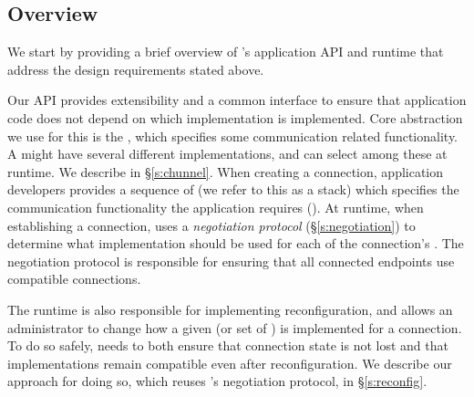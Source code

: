 \begin{outline}
      \2 
\end{outline}

\subsection{\name Overview}
\begin{outline}
\0 We start by providing a brief overview of \name's application API and runtime that address the design requirements stated above.

\0 Our API provides extensibility and a common interface to ensure that application code does not depend on which implementation is implemented.
    \1 Core abstraction we use for this is the \tunnel, which specifies some communication related functionality. A \tunnel might have several different implementations, and \name can select among these at runtime. We describe \tunnels in \S\ref{s:chunnel}.
    \1 When creating a connection, application developers provides a sequence of \tunnels (we refer to this as a \tunnel stack) which specifies the communication functionality the application requires ().
    \1 At runtime, when establishing a connection, \name uses a \emph{negotiation protocol} (\S\ref{s:negotiation}) to determine what implementation should be used for each of the connection's \tunnels. The negotiation protocol is responsible for ensuring that all connected endpoints use compatible connections.

\0 The \name runtime is also responsible for implementing reconfiguration, and allows an administrator to change how a given \tunnel (or set of \tunnels) is implemented for a connection.
    \1 To do so safely, \name needs to both ensure that connection state is not lost and that \tunnel implementations remain compatible even after reconfiguration. We describe our approach for doing so, which reuses \name's negotiation protocol, in \S\ref{s:reconfig}.
\end{outline}

